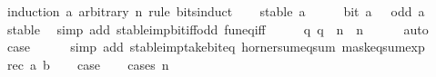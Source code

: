 \begin{isabellebody}
%
\isadelimproof
%
\endisadelimproof
%
\isatagproof
{}\isamarkupfalse%
\ {\isacharparenleft}{\kern0pt}induction\ a\ arbitrary{\isacharcolon}{\kern0pt}\ n\ rule{\isacharcolon}{\kern0pt}\ bits{\isacharunderscore}{\kern0pt}induct{\isacharparenright}{\kern0pt}\isanewline
\ \ \isamarkupfalse%
\ {\isacharparenleft}{\kern0pt}stable\ a{\isacharparenright}{\kern0pt}\isanewline
\ \ \isamarkupfalse%
\ \isamarkupfalse%
\ {\isacartoucheopen}bit\ a\ {\isacharequal}{\kern0pt}\ {\isacharparenleft}{\kern0pt}{\isasymlambda}{\isacharunderscore}{\kern0pt}{\isachardot}{\kern0pt}\ odd\ a{\isacharparenright}{\kern0pt}{\isacartoucheclose}\isanewline
\ \ \ \ \isamarkupfalse%
\ stable\ \isamarkupfalse%
\ {\isacharparenleft}{\kern0pt}simp\ add{\isacharcolon}{\kern0pt}\ stable{\isacharunderscore}{\kern0pt}imp{\isacharunderscore}{\kern0pt}bit{\isacharunderscore}{\kern0pt}iff{\isacharunderscore}{\kern0pt}odd\ fun{\isacharunderscore}{\kern0pt}eq{\isacharunderscore}{\kern0pt}iff{\isacharparenright}{\kern0pt}\isanewline
\ \ \isamarkupfalse%
\ \isamarkupfalse%
\ {\isacartoucheopen}{\isacharbraceleft}{\kern0pt}q{\isachardot}{\kern0pt}\ q\ {\isacharless}{\kern0pt}\ n{\isacharbraceright}{\kern0pt}\ {\isacharequal}{\kern0pt}\ {\isacharbraceleft}{\kern0pt}{}{\isachardot}{\kern0pt}{\isachardot}{\kern0pt}{\isacharless}{\kern0pt}n{\isacharbraceright}{\kern0pt}{\isacartoucheclose}\isanewline
\ \ \ \ \isamarkupfalse%
\ auto\isanewline
\ \ \isamarkupfalse%
\ \isamarkupfalse%
\ {\isacharquery}{\kern0pt}case\isanewline
\ \ \ \ \isamarkupfalse%
\ {\isacharparenleft}{\kern0pt}simp\ add{\isacharcolon}{\kern0pt}\ stable{\isacharunderscore}{\kern0pt}imp{\isacharunderscore}{\kern0pt}take{\isacharunderscore}{\kern0pt}bit{\isacharunderscore}{\kern0pt}eq\ horner{\isacharunderscore}{\kern0pt}sum{\isacharunderscore}{\kern0pt}eq{\isacharunderscore}{\kern0pt}sum\ mask{\isacharunderscore}{\kern0pt}eq{\isacharunderscore}{\kern0pt}sum{\isacharunderscore}{\kern0pt}exp{\isacharparenright}{\kern0pt}\isanewline
{}\isamarkupfalse%
\isanewline
\ \ \isamarkupfalse%
\ {\isacharparenleft}{\kern0pt}rec\ a\ b{\isacharparenright}{\kern0pt}\isanewline
\ \ \isamarkupfalse%
\ {\isacharquery}{\kern0pt}case\isanewline
\ \ \isamarkupfalse%
\ {\isacharparenleft}{\kern0pt}cases\ n{\isacharparenright}{\kern0pt}\isanewline
\ \ \ \ \isamarkupfalse%

\end{isabellebody}
